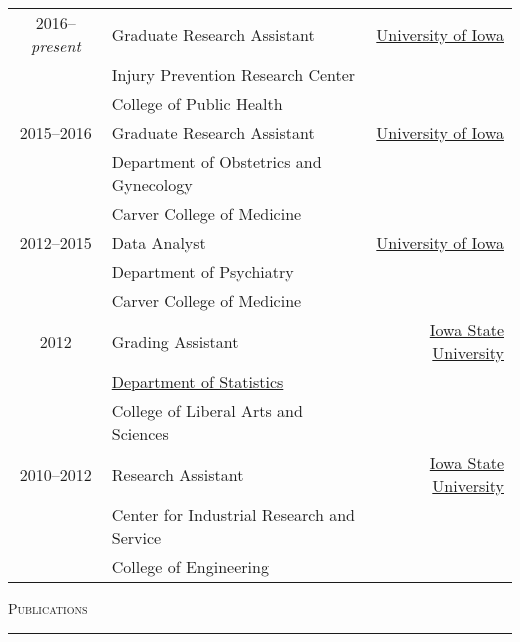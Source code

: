 \documentclass[a4paper]{article}
\newcommand{\uiowa}{\href{https://www.uiowa.edu}{University of Iowa}}
\newcommand{\isu}{\href{https://www.iastate.edu/}{Iowa State University}}
\newcommand{\deptstat}{\href{https://stat.iastate.edu/}{Department of Statistics}}
\begin{document}
\begin{tabular*}{0.9\textwidth}{@{\extracolsep{\fill}}clr}
  2016--\textit{present} & Graduate Research Assistant & \uiowa \\
   & Injury Prevention Research Center & \\
   & College of Public Health & \\[3pt]
  2015--2016 & Graduate Research Assistant & \uiowa \\
   & Department of Obstetrics and Gynecology & \\
   & Carver College of Medicine & \\[3pt]
  2012--2015 & Data Analyst & \uiowa \\
   & Department of Psychiatry & \\
   & Carver College of Medicine & \\[3pt]
  2012 & Grading Assistant & \isu \\
   & \deptstat & \\
   & College of Liberal Arts and Sciences & \\[3pt]
  2010--2012 & Research Assistant & \isu \\
   & Center for Industrial Research and Service \\
   & College of Engineering &
\end{tabular*}
\vspace{0.25\baselineskip}

\begin{flushleft}
  \Large\textsc{Publications}
  \textcolor{usafagrey}{\rule[0.5\baselineskip]{\textwidth}{0.75pt}}
\end{flushleft}
\vspace{-1.5\baselineskip}
\end{document}
